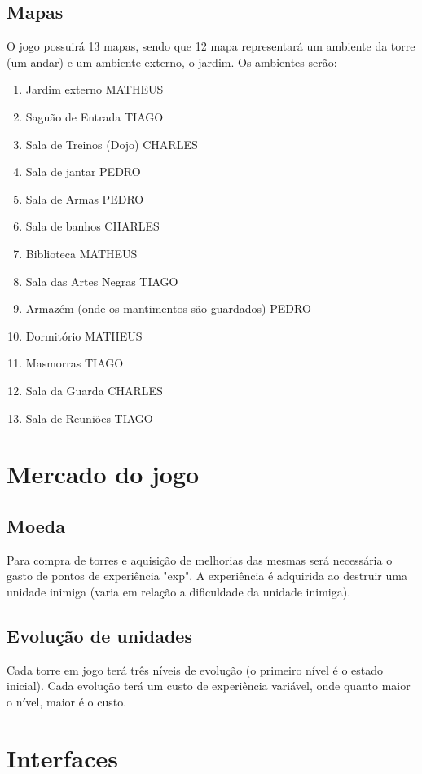 \documentclass[12pt,a4paper]{article}
\begin{document}
\subsection{Mapas}
	O jogo possuirá 13 mapas, sendo que 12 mapa representará um ambiente da torre (um andar) e
um ambiente externo, o jardim. Os ambientes serão:
\begin{enumerate}
\item Jardim externo
MATHEUS
\item Saguão de Entrada
TIAGO
\item Sala de Treinos (Dojo)
CHARLES
\item Sala de jantar
PEDRO
\item Sala de Armas
PEDRO
\item Sala de banhos
CHARLES
\item Biblioteca
MATHEUS
\item Sala das Artes Negras
TIAGO
\item Armazém (onde os mantimentos são guardados)
PEDRO
\item Dormitório
MATHEUS
\item Masmorras
TIAGO
\item Sala da Guarda
CHARLES
\item Sala de Reuniões
TIAGO

\end{enumerate}

\section{Mercado do jogo}
\subsection{Moeda}
	Para compra de torres e aquisição de melhorias das mesmas será necessária o gasto de pontos
de experiência "exp". A experiência é adquirida ao destruir uma unidade inimiga (varia em relação a
dificuldade da unidade inimiga).
\subsection{Evolução de unidades}
	Cada torre em jogo terá três níveis de evolução (o primeiro nível é o estado inicial). Cada
evolução terá um custo de experiência variável, onde quanto maior o nível, maior é o custo.

\section{Interfaces}
\end{document}

